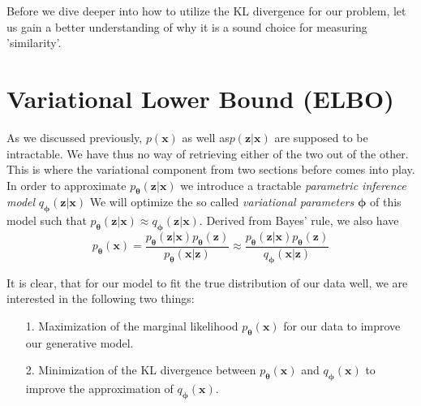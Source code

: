 \documentclass[12pt]{report}
\theoremstyle{definition}
\begin{document}
Before we dive deeper into how to utilize the KL divergence for our problem, let us gain a better understanding of why it is a sound choice for measuring 'similarity'. %

\section{Variational Lower Bound (ELBO)}
As we discussed previously, $p(\mathbf{x})$ as well as$p(\mathbf{z}|\mathbf{x})$ are supposed to be intractable. We have thus no way of retrieving either of the two out of the other. This is where the variational component from two sections before comes into play. In order to approximate $p_{\mathbf{\theta}}(\mathbf{z}|\mathbf{x})$ we introduce a tractable \emph{parametric inference model} $q_{\mathbf{\phi}}(\mathbf{z}|\mathbf{x})$ We will optimize the so called \emph{variational parameters} $\mathbf{\phi}$ of this model such that $p_{\mathbf{\theta}}(\mathbf{z}|\mathbf{x}) \approx q_{\mathbf{\phi}}(\mathbf{z}|\mathbf{x})$.
Derived from Bayes' rule, we also have
\begin{equation}
	p_{\mathbf{\theta}}(\mathbf{x}) = \frac{p_{\mathbf{\theta}}(\mathbf{z}|\mathbf{x}) p_{\mathbf{\theta}}(\mathbf{z})}{p_{\mathbf{\theta}}(\mathbf{x}|\mathbf{z})} \approx  \frac{p_{\mathbf{\theta}}(\mathbf{z}|\mathbf{x}) p_{\mathbf{\theta}}(\mathbf{z})}{q_{\mathbf{\phi}}(\mathbf{x}|\mathbf{z})}
\end{equation}

It is clear, that for our model to fit the true distribution of our data well, we are interested in the following two things:
\begin{itemize}
	\item[1.] Maximization of the marginal likelihood $p_{\mathbf{\theta}}(\mathbf{x})$ for our data to improve our generative model.
	\item[2.] Minimization of the KL divergence between $p_{\mathbf{\theta}}(\mathbf{x})$ and $q_{\mathbf{\phi}}(\mathbf{x})$ to improve the approximation of $q_{\mathbf{\phi}}(\mathbf{x})$.
\end{itemize}
\end{document}
